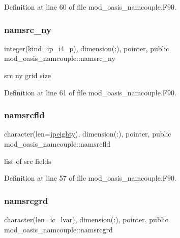 Definition at line 60 of file mod\+\_\+oasis\+\_\+namcouple.\+F90.

\mbox{\label{namespacemod__oasis__namcouple_ab82c80f007b37865172ddb033a1abb36}} 
\subsubsection{\texorpdfstring{namsrc\+\_\+ny}{namsrc\_ny}}
{\footnotesize\ttfamily integer(kind=ip\+\_\+i4\+\_\+p), dimension(\+:), pointer, public mod\+\_\+oasis\+\_\+namcouple\+::namsrc\+\_\+ny}



src ny grid size 



Definition at line 61 of file mod\+\_\+oasis\+\_\+namcouple.\+F90.

\mbox{\label{namespacemod__oasis__namcouple_a5fcb5a4f2a49f414fafe38b03c5c089d}} 
\subsubsection{\texorpdfstring{namsrcfld}{namsrcfld}}
{\footnotesize\ttfamily character(len=\hyperlink{namespacemod__oasis__namcouple_a4fb10ad6e864dcbe34c4a8b02204a523}{jpeighty}), dimension(\+:), pointer, public mod\+\_\+oasis\+\_\+namcouple\+::namsrcfld}



list of src fields 



Definition at line 57 of file mod\+\_\+oasis\+\_\+namcouple.\+F90.

\mbox{\label{namespacemod__oasis__namcouple_a589c1bae58b10bcb0cfb30c0893a7895}} 
\subsubsection{\texorpdfstring{namsrcgrd}{namsrcgrd}}
{\footnotesize\ttfamily character(len=ic\+\_\+lvar), dimension(\+:), pointer, public mod\+\_\+oasis\+\_\+namcouple\+::namsrcgrd}



